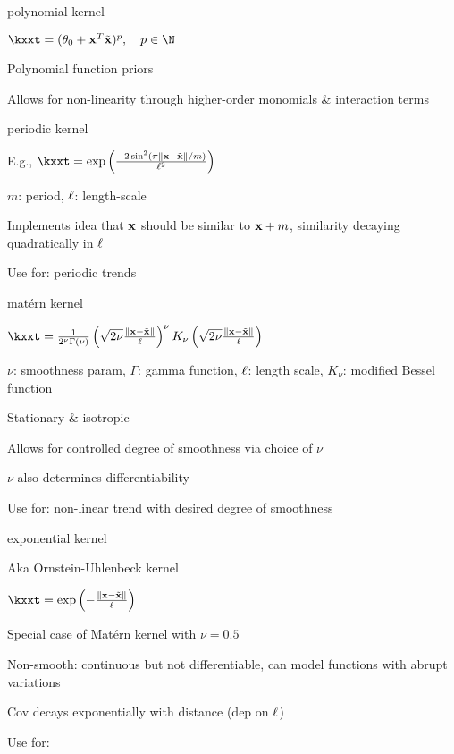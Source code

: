 \documentclass[11pt,compress,t,notes=noshow, xcolor=table]{beamer}
\begin{document}
\begin{framei}{polynomial kernel}
\item $\kxxt = (\theta_0 + \xv^T \xtil )^p, \quad p \in \N$
\item Polynomial function priors
\item Allows for non-linearity through higher-order monomials \& interaction terms
\vfill
{}
\end{framei}

\begin{framei}{periodic kernel}
\item E.g., $\kxxt = \exp \left(\frac{-2\sin^2 (\pi \xxtnorm / m)}{\ls^2} \right)$
\item $m$: period, $\ell$: length-scale
\item Implements idea that $\mathbf{x}$ should be similar to $\mathbf{x} + m$, similarity decaying quadratically in $\ell$
\item Use for: periodic trends
\vfill
{}
\end{framei}

\begin{framei}{matérn kernel}
\item $\kxxt = \frac{1}{2^\nu \Gamma(\nu)} \left( \sqrt{2 \nu} \frac{\xxtnorm}{\ls} \right)^\nu K_\nu \left( \sqrt{2 \nu} \frac{\xxtnorm}{\ls} \right)$
\item $\nu$: smoothness param, $\Gamma$: gamma function, $\ell$: length scale, $K_\nu$: modified Bessel function
\item Stationary \& isotropic
\item Allows for controlled degree of smoothness via choice of $\nu$
\item $\nu$ also determines differentiability
\item Use for: non-linear trend with desired degree of smoothness
\vfill
{}
\end{framei}

\begin{framei}{exponential kernel}
\item Aka Ornstein-Uhlenbeck kernel
\item $\kxxt = \exp \left(-\frac{\xxtnorm}{\ls} \right)$
\item Special case of Matérn kernel with $\nu = 0.5$
\item Non-smooth: continuous but not differentiable, can model functions with abrupt variations
\item Cov decays exponentially with distance (dep on $\ell$)
\item Use for: 
\end{framei}
\end{document}
